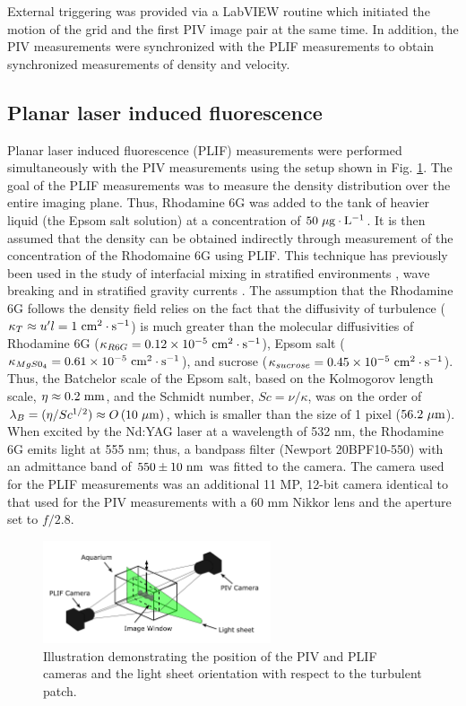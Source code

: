 \documentclass{piv13-abstract}
\newcommand{\unit}[1]{\ensuremath{\, \mathrm{\hspace{0.5mm}#1}}}
\newcommand{\figLabel}{Fig. }
\begin{document}
External triggering was provided via a LabVIEW routine which initiated the motion of the grid and the first PIV image pair at the same time. In addition, the PIV measurements were synchronized with the PLIF measurements to obtain synchronized measurements of density and velocity.

\subsection{Planar laser induced fluorescence}
\label{sec:PLIF}

Planar laser induced fluorescence (PLIF) measurements were performed simultaneously with the PIV measurements using the setup shown in \figLabel\ref{fig:plif_piv_setup}. The goal of the PLIF measurements was to measure the density distribution over the entire imaging plane. Thus, Rhodamine 6G was added to the tank of heavier liquid (the Epsom salt solution) at a concentration of $50\unit{\mu g\cdot L^{-1}}$. It is then assumed that the density can be obtained indirectly through measurement of the concentration of the Rhodomaine 6G using PLIF. This technique has previously been used in the study of interfacial mixing in stratified environments \cite{Atsavapranee1997}, wave breaking \cite{Troy2005} and in stratified gravity currents \cite{Odier2009}. The assumption that the Rhodamine 6G follows the density field relies on the fact that the diffusivity of turbulence ($\kappa_T\approx u^{\prime}l=1 \unit{cm^2\cdot s^{-1}}$) is much greater than the molecular diffusivities of Rhodamine 6G ($\kappa_{R6G}=0.12\times 10^{-5}\unit{cm^2\cdot s^{-1}}$), Epsom salt ($\kappa_{MgS0_4}=0.61\times 10^{-5}\unit{cm^2\cdot s^{-1}}$), and sucrose ($\kappa_{sucrose}=0.45\times 10^{-5}\unit{cm^2\cdot s^{-1}}$). Thus, the Batchelor scale of the Epsom salt, based on the Kolmogorov length scale, $\eta\approx 0.2\unit{mm}$, and the Schmidt number, $Sc=\nu/\kappa$, was on the order of $\lambda_B=(\eta/Sc^{1/2})\approx O\left(10\unit{\mu m}\right)$, which is smaller than the size of 1 pixel ($56.2\unit{\mu m}$). When excited by the Nd:YAG laser at a wavelength of 532 nm, the Rhodamine 6G emits light at 555 nm; thus, a bandpass filter (Newport 20BPF10-550) with an admittance band of $550\pm10\unit{nm}$ was fitted to the camera. The camera used for the PLIF measurements was an additional 11 MP, 12-bit camera identical to that used for the PIV measurements with a 60 mm Nikkor lens and the aperture set to $f/2.8$.

\begin{figure}[h]
\centering
\includegraphics[width=0.6\textwidth]{figures/plif_piv.pdf}
\caption{Illustration demonstrating the position of the PIV and PLIF cameras and the light sheet orientation with respect to the turbulent patch. \label{fig:plif_piv_setup}}
\end{figure}
\end{document}
